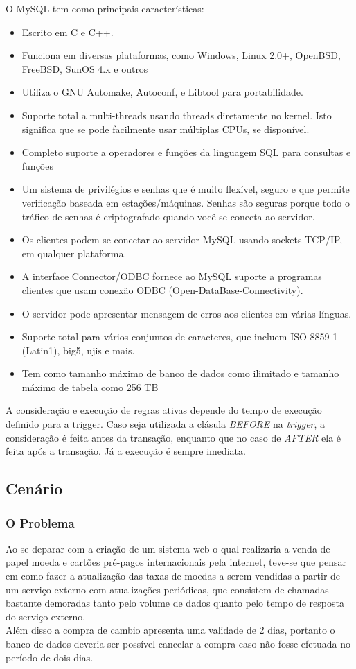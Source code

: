 \documentclass[conference]{IEEEtran}
\begin{document}
    O MySQL tem como principais características:
    \begin{itemize}
    \item Escrito em C e C++.
    \item Funciona em diversas plataformas, como Windows, Linux 2.0+, OpenBSD, FreeBSD, SunOS 4.x e outros
    \item Utiliza o GNU Automake, Autoconf, e Libtool para portabilidade.
    \item Suporte total a multi-threads usando threads diretamente no kernel. Isto significa que se pode facilmente usar múltiplas CPUs, se disponível.
    \item Completo suporte a operadores e funções da linguagem SQL para consultas e funções
    \item Um sistema de privilégios e senhas que é muito flexível, seguro e que permite verificação baseada em estações/máquinas. Senhas são seguras porque todo o tráfico de senhas é criptografado quando você se conecta ao servidor.
    \item Os clientes podem se conectar ao servidor MySQL usando sockets TCP/IP, em qualquer plataforma.
    \item A interface Connector/ODBC fornece ao MySQL suporte a programas clientes que usam conexão ODBC (Open-DataBase-Connectivity). 
    \item O servidor pode apresentar mensagem de erros aos clientes em várias línguas. 
    \item Suporte total para vários conjuntos de caracteres, que incluem ISO-8859-1 (Latin1), big5, ujis e mais.
    \item Tem como tamanho máximo de banco de dados como ilimitado e tamanho máximo de tabela como 256 TB
    \end{itemize}

    A consideração e execução de regras ativas depende do tempo de execução definido para a trigger. Caso seja utilizada a clásula \textit{BEFORE} na \textit{trigger}, a consideração é feita antes da transação, enquanto que no caso de \textit{AFTER} ela é feita após a transação. Já a execução é sempre imediata.\cite{caracteristica-myssql}

  \subsection{Cenário}
    \subsubsection{O Problema} Ao se deparar com a criação de um sistema web o qual realizaria a venda de papel moeda e cartões pré-pagos internacionais pela internet, teve-se que pensar em como fazer a atualização das taxas de moedas a serem vendidas a partir de um serviço externo com atualizações periódicas, que consistem de chamadas bastante demoradas tanto pelo volume de dados quanto pelo tempo de resposta do serviço externo.\\
    Além disso a compra de cambio apresenta uma validade de 2 dias, portanto o banco de dados deveria ser possível cancelar a compra caso não fosse efetuada no período de dois dias.
\end{document}
